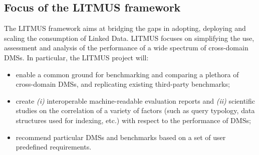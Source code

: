 \documentclass{llncs}
\begin{document}
    \subsection{Focus of the LITMUS framework}
        The LITMUS framework aims at bridging the gaps in adopting, deploying and scaling the consumption of Linked Data. LITMUS focuses on simplifying the use, assessment and analysis of the performance of a wide spectrum of cross-domain DMSs. In particular, the LITMUS project will: 
        \begin{itemize}[nosep]
            \item {} enable a common ground for benchmarking and comparing a plethora of cross-domain DMSs, and replicating existing third-party benchmarks;
            \item {} create \textit{(i)} interoperable machine-readable evaluation reports and
            \textit{(ii)} scientific studies on the correlation of a variety of factors (such as query typology, data structures used for indexing, etc.) with respect to the performance of DMSs; 
            \item {} recommend particular DMSs and benchmarks based on a set of user predefined requirements.  
        \end{itemize}
            
        
\end{document}
